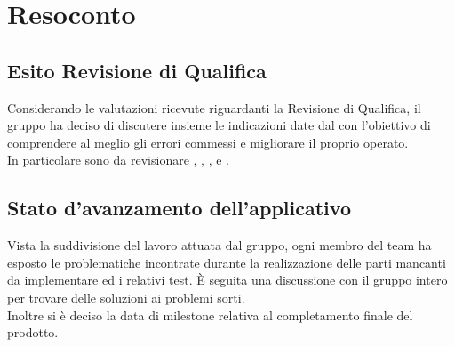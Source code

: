 \section{Resoconto}
\subsection{Esito Revisione di Qualifica} 
Considerando le valutazioni ricevute riguardanti la Revisione di Qualifica, il gruppo ha deciso di discutere insieme le indicazioni date dal \VT{} con l'obiettivo di comprendere al meglio gli errori commessi e migliorare il proprio operato. \\
In particolare sono da revisionare \NdP, \PdQ, \PdP, \MM{} e \MU.

\subsection{Stato d'avanzamento dell'applicativo}
Vista la suddivisione del lavoro attuata dal gruppo, ogni membro del team ha esposto le problematiche incontrate durante la realizzazione delle parti mancanti da implementare ed i relativi test. È seguita una discussione con il gruppo intero per trovare delle soluzioni ai problemi sorti.\\
Inoltre si è deciso la data di milestone relativa al completamento finale del prodotto.
